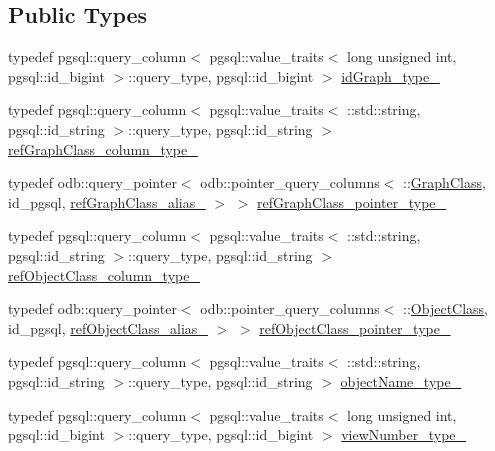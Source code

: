 \subsection*{Public Types}
\begin{DoxyCompactItemize}
\item 
typedef pgsql\+::query\+\_\+column$<$ pgsql\+::value\+\_\+traits$<$ long unsigned int, pgsql\+::id\+\_\+bigint $>$\+::query\+\_\+type, pgsql\+::id\+\_\+bigint $>$ \hyperlink{structodb_1_1query__columns_3_01_1_1_graph_00_01id__pgsql_00_01_a_01_4_a2e08560e3141bc01757b5ca76ccf7106}{id\+Graph\+\_\+type\+\_\+}
\item 
typedef pgsql\+::query\+\_\+column$<$ pgsql\+::value\+\_\+traits$<$ \+::std\+::string, pgsql\+::id\+\_\+string $>$\+::query\+\_\+type, pgsql\+::id\+\_\+string $>$ \hyperlink{structodb_1_1query__columns_3_01_1_1_graph_00_01id__pgsql_00_01_a_01_4_a4acfad79ba5834b07df2fca207c93284}{ref\+Graph\+Class\+\_\+column\+\_\+type\+\_\+}
\item 
typedef odb\+::query\+\_\+pointer$<$ odb\+::pointer\+\_\+query\+\_\+columns$<$ \+::\hyperlink{class_graph_class}{Graph\+Class}, id\+\_\+pgsql, \hyperlink{structodb_1_1query__columns__base_3_01_1_1_graph_00_01id__pgsql_01_4_a4306d56e8c22637d01aec76fb2662416}{ref\+Graph\+Class\+\_\+alias\+\_\+} $>$ $>$ \hyperlink{structodb_1_1query__columns_3_01_1_1_graph_00_01id__pgsql_00_01_a_01_4_a4b2c76decf6a3ad49cf2b4c10f5d0e41}{ref\+Graph\+Class\+\_\+pointer\+\_\+type\+\_\+}
\item 
typedef pgsql\+::query\+\_\+column$<$ pgsql\+::value\+\_\+traits$<$ \+::std\+::string, pgsql\+::id\+\_\+string $>$\+::query\+\_\+type, pgsql\+::id\+\_\+string $>$ \hyperlink{structodb_1_1query__columns_3_01_1_1_graph_00_01id__pgsql_00_01_a_01_4_abdd48668c97ac95a12e1fc0d1b49e7ee}{ref\+Object\+Class\+\_\+column\+\_\+type\+\_\+}
\item 
typedef odb\+::query\+\_\+pointer$<$ odb\+::pointer\+\_\+query\+\_\+columns$<$ \+::\hyperlink{class_object_class}{Object\+Class}, id\+\_\+pgsql, \hyperlink{structodb_1_1query__columns__base_3_01_1_1_graph_00_01id__pgsql_01_4_ab9ee301664ba12da094e2866ff789e53}{ref\+Object\+Class\+\_\+alias\+\_\+} $>$ $>$ \hyperlink{structodb_1_1query__columns_3_01_1_1_graph_00_01id__pgsql_00_01_a_01_4_a49b77bfafd35519781be11ece1d25911}{ref\+Object\+Class\+\_\+pointer\+\_\+type\+\_\+}
\item 
typedef pgsql\+::query\+\_\+column$<$ pgsql\+::value\+\_\+traits$<$ \+::std\+::string, pgsql\+::id\+\_\+string $>$\+::query\+\_\+type, pgsql\+::id\+\_\+string $>$ \hyperlink{structodb_1_1query__columns_3_01_1_1_graph_00_01id__pgsql_00_01_a_01_4_af1eaa59c77dd7e1dd9c1862e14eec294}{object\+Name\+\_\+type\+\_\+}
\item 
typedef pgsql\+::query\+\_\+column$<$ pgsql\+::value\+\_\+traits$<$ long unsigned int, pgsql\+::id\+\_\+bigint $>$\+::query\+\_\+type, pgsql\+::id\+\_\+bigint $>$ \hyperlink{structodb_1_1query__columns_3_01_1_1_graph_00_01id__pgsql_00_01_a_01_4_ab2eead097e6b06f77d6438902addfa9d}{view\+Number\+\_\+type\+\_\+}
\end{DoxyCompactItemize}
